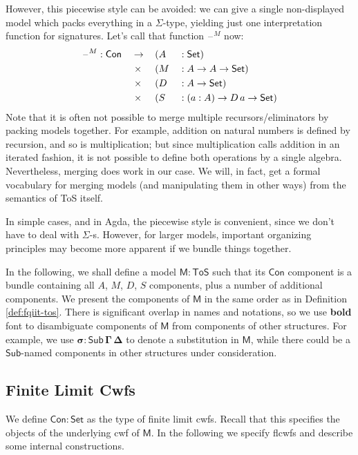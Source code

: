 \documentclass[12pt,a4paper,twoside,openany]{book}
\theoremstyle{remark}
\theoremstyle{definition}
\theoremstyle{theorem}
\newcommand{\bs}[1]{\boldsymbol{#1}}
\newcommand{\Con}{\mathsf{Con}}
\newcommand{\Sub}{\mathsf{Sub}}
\newcommand{\blank}{\mathord{\hspace{1pt}\text{--}\hspace{1pt}}}
\newcommand{\Set}{\mathsf{Set}}
\newcommand{\ToS}{\mathsf{ToS}}
\newcommand{\bCon}{\boldsymbol{\Con}}
\newcommand{\bM}{\boldsymbol{\mathsf{M}}}
\begin{document}
However, this piecewise style can be avoided: we can give a single non-displayed
model which packs everything in a $\Sigma$-type, yielding just one
interpretation function for signatures. Let's call that function $\blank^M$ now:
\begin{alignat*}{5}
  & \blank^M : \Con &&\to \,&&(A &&: \Set)\\
  & &&\hspace{0.3em}\times &&(M  &&: A \to A \to \Set)\\
  & &&\hspace{0.3em}\times &&(D  &&: A \to \Set)\\
  & &&\hspace{0.3em}\times &&(S  &&: (a : A) \to D\,a \to \Set)
\end{alignat*}
Note that it is often not possible to merge multiple recursors/eliminators by
packing models together. For example, addition on natural numbers is defined by
recursion, and so is multiplication; but since multiplication calls addition in
an iterated fashion, it is not possible to define both operations by a single
algebra. Nevertheless, merging does work in our case. We will, in fact, get a
formal vocabulary for merging models (and manipulating them in other ways) from
the semantics of ToS itself.

In simple cases, and in Agda, the piecewise style is convenient, since we don't
have to deal with $\Sigma$-s. However, for larger models, important organizing
principles may become more apparent if we bundle things together.

In the following, we shall define a model $\bM : \ToS$ such that its $\Con$
component is a bundle containing all $A$, $M$, $D$, $S$ components, plus a
number of additional components. We present the components of $\bM$ in the same
order as in Definition \ref{def:fqiit-tos}. There is significant overlap in
names and notations, so we use \textbf{bold} font to disambiguate components of
$\bM$ from components of other structures. For example, we use $\bs{\sigma :
  \Sub\,\Gamma\,\Delta}$ to denote a substitution in $\bM$, while there could be
a $\Sub$-named components in other structures under consideration.

\subsection{Finite Limit Cwfs}

We define $\bCon : \Set$ as the type of finite limit cwfs. Recall that this
specifies the objects of the underlying cwf of $\bM$. In the following we
specify flcwfs and describe some internal constructions.
\end{document}
